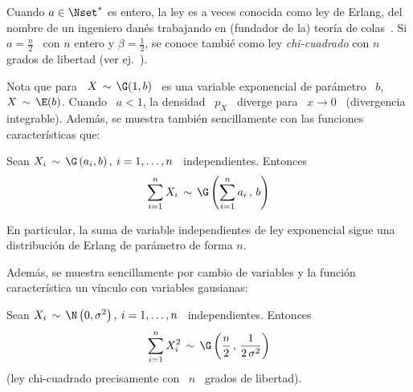 Cuando $a \in \Nset^*$ es entero, la ley es a veces conocida como ley de Erlang,
del nombre  de un ingeniero dan\'es  trabajando en (fundador de  la) teor\'ia de
colas~\cite{Cox62, Erl09, Erl25, Bro48}.  Si  $a = \frac{n}{2}$ \ con $n$ entero
y $\beta  = \frac12$,  se conoce  tambi\'e como ley  {\em chi-cuadrado}  con $n$
grados de libertad (ver ej.~\cite{JohKot95:v1}).

Nota  que para  \  $X \,  \sim  \, \G(1,b)$  \ es  una  variable exponencial  de
par\'ametro \  $b$, \ie \ $X \,  \sim \, \E(b)$. Cuando  \ $a < 1$,  la densidad \
$p_X$  \ diverge  para \  $x  \to 0$  \ (divergencia  integrable). Adem\'as,  se
muestra tambi\'en sencillamente con las funciones caracter\'isticas que:
%
\begin{lema}[Stabilidad]
\label{Lem:MP:StabilidadGamma}
%
  Sean $X_i  \, \sim  \, \G\left( a_i  , b  \right), \: i  = 1 ,  \ldots ,  n$ \
  independientes. Entonces
  \[
  \sum_{i=1}^n X_i \, \sim \, \G\left( \sum_{i=1}^n a_i \, , \, b \right)
  \]
\end{lema}
%
En particular, la  suma de variable independientes de  ley exponencial sigue una
distribuci\'on de Erlang de par\'ametro de forma $n$.

Adem\'as,  se muestra  sencillamente  por  cambio de  variables  y la  funci\'on
caracter\'istica un v\'inculo con variables gausianas:
%
\begin{lema}
\label{Lem:MP:VinculoGammaGaussiana}
%
  Sean $X_i \, \sim \,  \N\left( 0 , \sigma^2 \right), \: i = 1  , \ldots , n$ \
  independientes. Entonces
  \[
  \sum_{i=1}^n  X_i^2 \,  \sim \,  \G\left( \frac{n}{2}  \, ,  \,  \frac{1}{2 \,
      \sigma^2} \right)
  \]
  (ley chi-cuadrado precisamente con \ $n$ \ grados de libertad).
\end{lema}

